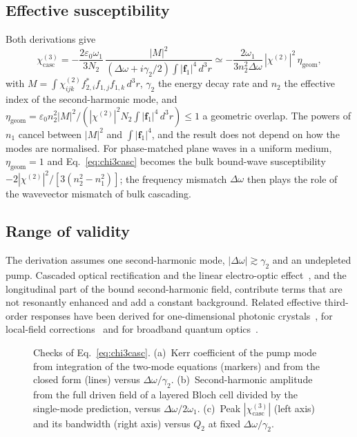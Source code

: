 \documentclass[aps,prapplied,onecolumn,superscriptaddress,longbibliography,nofootinbib]{revtex4-2}
\newcommand{\chitwo}{\chi^{(2)}}
\newcommand{\chicasc}{\chi^{(3)}_{\mathrm{casc}}}
\newcommand{\Dom}{\Delta\omega}
\newcommand{\etag}{\eta_{\mathrm{geom}}}
\newcommand{\f}{\mathbf f}
\newcommand{\figbox}[1]{%
  \fbox{\parbox[c][#1][c]{0.92\linewidth}{\centering\small figure in preparation}}}
\begin{document}
\subsection{Effective susceptibility}

Both derivations give
\begin{equation}
  \chicasc=-\frac{2\varepsilon_0\omega_1}{3N_2}\,
    \frac{|M|^2}{(\Dom+i\gamma_2/2)\int|\f_1|^4\,d^3r}
  \simeq-\frac{2\omega_1}{3n_2^2\Dom}\,|\chitwo|^2\,\etag ,
  \label{eq:chi3casc}
\end{equation}
with $M=\int\chitwo_{ijk}f^*_{2,i}f_{1,j}f_{1,k}\,d^3r$, $\gamma_2$ the
energy decay rate and $n_2$ the effective index of the second-harmonic
mode, and
$\etag=\varepsilon_0n_2^2|M|^2/(|\chitwo|^2N_2\int|\f_1|^4\,d^3r)\le1$ a
geometric overlap.  The powers of $n_1$ cancel between $|M|^2$ and
$\int|\f_1|^4$, and the result does not depend on how the modes are
normalised.  For phase-matched plane waves in a uniform medium,
$\etag=1$ and Eq.~\eqref{eq:chi3casc} becomes the bulk bound-wave
susceptibility $-2|\chitwo|^2/[3(n_2^2-n_1^2)]$; the frequency mismatch
$\Dom$ then plays the role of the wavevector mismatch of bulk cascading.

\subsection{Range of validity}

The derivation assumes one second-harmonic mode, $|\Dom|\gtrsim\gamma_2$
and an undepleted pump.  Cascaded optical rectification and the linear
electro-optic effect~\cite{bosshard1995}, and the longitudinal part of the
bound second-harmonic field, contribute terms that are not resonantly
enhanced and add a constant background.  Related effective third-order
responses have been derived for one-dimensional photonic
crystals~\cite{hagmann2008}, for local-field corrections~\cite{kolleck2004}
and for broadband quantum optics~\cite{gustin2025}.

\begin{figure}[t]
  \centering
  \figbox{4cm}
  \caption{Checks of Eq.~\eqref{eq:chi3casc}.
    (a)~Kerr coefficient of the pump mode from integration of the two-mode
    equations (markers) and from the closed form (lines) versus
    $\Dom/\gamma_2$.
    (b)~Second-harmonic amplitude from the full driven field of a layered
    Bloch cell divided by the single-mode prediction, versus
    $\Dom/2\omega_1$.
    (c)~Peak $|\chicasc|$ (left axis) and its bandwidth (right axis) versus
    $Q_2$ at fixed $\Dom/\gamma_2$.}
  \label{fig:checks}
\end{figure}
\end{document}
